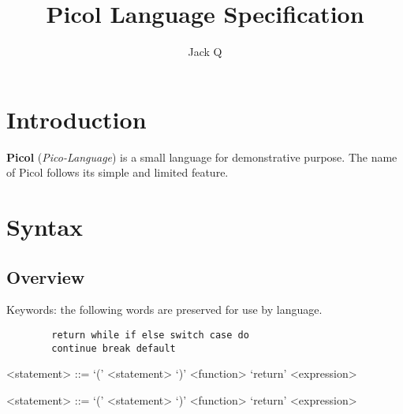 \documentclass[a4paper, 11.5pt]{article}
\title{Picol Language Specification}
\author{Jack Q}
\begin{document}
\maketitle

  \begin{multicols}{2}

  \section{Introduction}
  {\bfseries Picol} (\emph{Pico-Language}) is a small language for demonstrative purpose. 
  The name of Picol follows its simple and limited feature.

  \section{Syntax}

  \subsection{Overview}

  Keywords: the following words are preserved for use by language.
   
    \begin{center}
      \begin{tcolorbox}[breakable, blanker, width=0.8\linewidth]
        \begin{verbatim}
        return while if else switch case do 
        continue break default
        \end{verbatim}
      \end{tcolorbox}
    \end{center}

\begin{grammar}
  <statement> ::= `(' <statement> `)'
             \alt <function>
             \alt `return' <expression>
\end{grammar}
\begin{grammar}
 <statement> ::= `(' <statement> `)'
             \alt <function>
             \alt `return' <expression>
\end{grammar}

\end{multicols}
\end{document}
